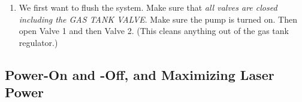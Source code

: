 \documentclass{../lab}
\begin{document}
\begin{enumerate}
    \item  We first want to flush the system. Make sure that \emph{all valves are closed including the GAS TANK VALVE}. Make sure the pump is turned on. Then open Valve 1 and then Valve 2. (This cleans anything out of the gas tank regulator.)
\end{enumerate}


\subsection{Power-On and -Off, and Maximizing Laser Power}
\end{document}
